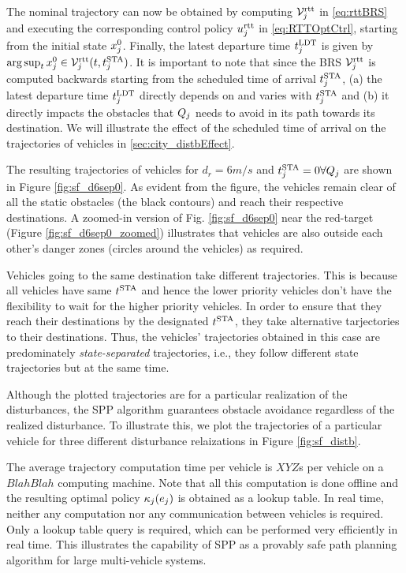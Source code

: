 The nominal trajectory can now be obtained by computing $\mathcal{V}_j^\text{rtt}$ in \eqref{eq:rttBRS} and executing the corresponding control policy $u_j^\text{rtt}$ in \eqref{eq:RTTOptCtrl}, starting from the initial state $x^0_j$. Finally, the latest departure time $t^\text{LDT}_j$ is given by $\arg \sup_t x^0_j \in \mathcal{V}_j^\text{rtt}(t, t^\text{STA}_j)$. It is important to note that since the BRS $\mathcal{V}_j^\text{rtt}$ is computed backwards starting from the scheduled time of arrival $t^\text{STA}_j$, (a) the latest departure time $t^\text{LDT}_j$ directly depends on and varies with $t^\text{STA}_j$ and (b) it directly impacts the obstacles that $Q_j$ needs to avoid in its path towards its destination. We will illustrate the effect of the scheduled time of arrival on the trajectories of vehicles in \ref{sec:city_distbEffect}.

The resulting trajectories of vehicles for $d_{r} = 6 m/s$ and $t^\text{STA}_j = 0 \forall Q_j$ are shown in Figure \ref{fig:sf_d6sep0}. As evident from the figure, the vehicles remain clear of all the static obstacles (the black contours) and reach their respective destinations. A zoomed-in version of Fig. \ref{fig:sf_d6sep0} near the red-target (Figure    \ref{fig:sf_d6sep0_zoomed}) illustrates that vehicles are also outside each other's danger zones (circles around the vehicles) as required. 

Vehicles going to the same destination take different trajectories. This is because all vehicles have same $t^\text{STA}$ and hence the lower priority vehicles don't have the flexibility to wait for the higher priority vehicles. In order to ensure that they reach their destinations by the designated $t^\text{STA}$, they take alternative tarjectories to their destinations. Thus, the vehicles' trajectories obtained in this case are predominately \textit{state-separated} trajectories, i.e., they follow different state trajectories but at the same time. 

Although the plotted trajectories are for a particular realization of the disturbances, the SPP algorithm guarantees obstacle avoidance regardless of the realized disturbance. To illustrate this, we plot the trajectories of a particular vehicle for three different disturbance relaizations in Figure \ref{fig:sf_distb}. 

The average trajectory computation time per vehicle is $XYZ$s per vehicle on a $Blah Blah$ computing machine. Note that all this computation is done offline and the resulting optimal policy $\kappa_j(e_j)$ is obtained as a lookup table. In real time, neither any computation nor any communication between vehicles is required. Only a lookup table query is required, which can be performed very efficiently in real time. This illustrates the capability of SPP as a provably safe path planning algorithm for large multi-vehicle systems.     